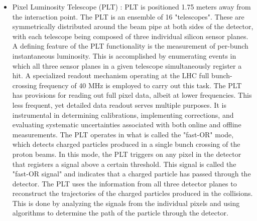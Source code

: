 \begin{itemize}
\item Pixel Luminosity Telescope (PLT) : PLT is positioned 1.75 meters away from the interaction point. The PLT is an ensemble of 16 "telescopes". These are symmetrically distributed around the beam pipe at both sides of the detector, with each telescope being composed of three individual silicon sensor planes. A defining feature of the PLT functionality is the measurement of per-bunch instantaneous luminosity. This is accomplished by enumerating events in which all three sensor planes in a given telescope simultaneously register a hit. A specialized readout mechanism operating at the LHC full bunch-crossing frequency of 40 MHz is employed to carry out this task. The PLT has provisions for reading out full pixel data, albeit at lower frequencies. This less frequent, yet detailed data readout serves multiple purposes. It is instrumental in determining calibrations, implementing corrections, and evaluating systematic uncertainties associated with both online and offline measurements. The PLT operates in what is called the "fast-OR" mode, which detects charged particles produced in a single bunch crossing of the proton beams. In this mode, the PLT triggers on any pixel in the detector that registers a signal above a certain threshold. This signal is called the "fast-OR signal" and indicates that a charged particle has passed through the detector. The PLT uses the information from all three detector planes to reconstruct the trajectories of the charged particles produced in the collisions. This is done by analyzing the signals from the individual pixels and using algorithms to determine the path of the particle through the detector.

\end{itemize}
